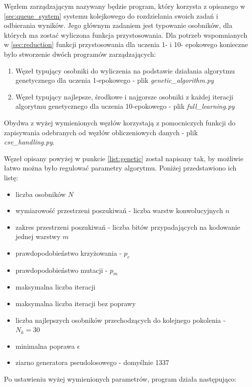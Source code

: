 Węzłem zarządzającym nazywany będzie program, który korzysta z opisanego w \ref{sec:queue_system} systemu kolejkowego do rozdzielania swoich zadań i odbierania wyników.
Jego głównym zadaniem jest typowanie osobników, dla których ma zostać wyliczona funkcja przystosowania.
Dla potrzeb wspomnianych w \ref{sec:reduction} funkcji przystosowania dla uczenia 1- i 10- epokowego konieczne było stworzenie dwóch programów zarządzających:
\begin{enumerate}
  \item Węzeł typujący osobniki do wyliczenia na podstawie działania algorytmu genetycznego dla uczenia 1-epokowego - plik \textit{genetic\_algorithm.py}\label{list:genetic}
  \item Węzeł typujący najlepsze, środkowe i najgorsze osobniki z każdej iteracji algorytmu genetycznego dla uczenia 10-epokowego - plik \textit{full\_learning.py}\label{list:full}
\end{enumerate}
Obydwa z wyżej wymienionych węzłów korzystają z pomocniczych funkcji do zapisywania odebranych od węzłów obliczeniowych danych - plik \textit{csv\_handling.py}.

Węzeł opisany powyżej w punkcie \ref{list:genetic} został napisany tak, by możliwie łatwo można było regulować parametry algorytmu.
Poniżej przedstawiono ich listę:
\begin{itemize}
  \item liczba osobników $N$
  \item wymiarowość przestrzeni poszukiwań - liczba warstw konwolucyjnych $n$
  \item zakres przestrzeni poszukiwań - liczba bitów przypadających na kodowanie jednej warstwy $m$
  \item prawdopodobieństwo krzyżowania - $p_{c}$
  \item prawdopodobieństwo mutacji - $p_{m}$
  \item maksymalna liczba iteracji
  \item maksymalna liczba iteracji bez poprawy
  \item liczba najlepszych osobników przechodzących do kolejnego pokolenia - $ N_{k} = 30$
  \item minimalna poprawa $\epsilon$
  \item ziarno generatora pseudolosowego - domyślnie 1337
\end{itemize}

Po ustawieniu wyżej wymienionych parametrów, program działa następująco:

